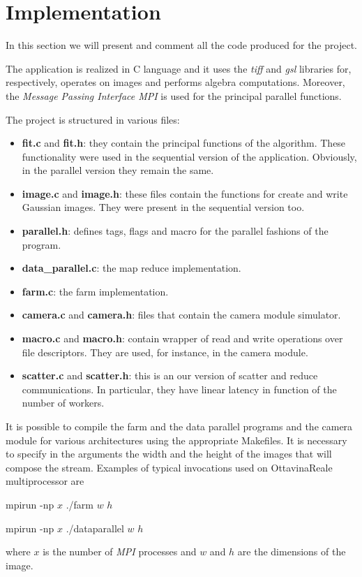 \section{Implementation}

In this section we will present and comment all the code produced for the project.

The application is realized in C language and it uses the \textit{tiff} and \textit{gsl} libraries for, respectively, operates on images and performs algebra computations. Moreover, the \textit{Message Passing Interface MPI} is used for the principal parallel functions.

The project is structured in various files:
\begin{itemize}
\item \textbf{fit.c} and \textbf{fit.h}: they contain the principal functions of the algorithm. These functionality were used in the sequential version of the application. Obviously, in the parallel version they remain the same.
\item \textbf{image.c} and \textbf{image.h}: these files contain the functions for create and write Gaussian images. They were present in the sequential version too.
\item \textbf{parallel.h}: defines tags, flags and macro for the parallel fashions of the program.
\item \textbf{data\_parallel.c}: the map reduce implementation.
\item \textbf{farm.c}: the farm implementation.
\item \textbf{camera.c} and \textbf{camera.h}: files that contain the camera module simulator.
\item \textbf{macro.c} and \textbf{macro.h}: contain wrapper of read and write operations over file descriptors. They are used, for instance, in the camera module.
\item \textbf{scatter.c} and \textbf{scatter.h}: this is an our version of scatter and reduce communications. In particular, they have linear latency in function of the number of workers.
\end{itemize}

It is possible to compile the farm and the data parallel programs and the camera module for various architectures using the appropriate Makefiles. It is necessary to specify in the arguments the width and the height of the images that will compose the stream. Examples of typical invocations used on OttavinaReale multiprocessor are
\begin{center}
mpirun -np $x$ ./farm $w$ $h$
\end{center}
\begin{center}
mpirun -np $x$ ./dataparallel $w$ $h$
\end{center}
where $x$ is the number of \textit{MPI} processes and $w$ and $h$ are the dimensions of the image.

